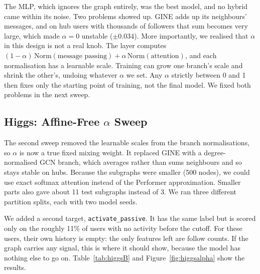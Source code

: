 The MLP, which ignores the graph entirely, was the best model, and no hybrid came within its noise. Two problems showed up. GINE adds up its neighbours' messages, and on hub users with thousands of followers that sum becomes very large, which made $\alpha=0$ unstable ($\pm0.034$). More importantly, we realised that $\alpha$ in this design is not a real knob. The layer computes $(1-\alpha)\,\mathrm{Norm}(\text{message passing}) + \alpha\,\mathrm{Norm}(\text{attention})$, and each normalisation has a learnable scale. Training can grow one branch's scale and shrink the other's, undoing whatever $\alpha$ we set. Any $\alpha$ strictly between 0 and 1 then fixes only the starting point of training, not the final model. We fixed both problems in the next sweep.

\subsection{Higgs: Affine-Free $\alpha$ Sweep}
The second sweep removed the learnable scales from the branch normalisations, so $\alpha$ is now a true fixed mixing weight. It replaced GINE with a degree-normalised GCN branch, which averages rather than sums neighbours and so stays stable on hubs. Because the subgraphs were smaller (500 nodes), we could use exact softmax attention instead of the Performer approximation. Smaller parts also gave about 11 test subgraphs instead of 3. We ran three different partition splits, each with two model seeds.

We added a second target, \texttt{activate\_\allowbreak passive}. It has the same label but is scored only on the roughly 11\% of users with no activity before the cutoff. For these users, their own history is empty: the only features left are follow counts. If the graph carries any signal, this is where it should show, because the model has nothing else to go on. Table~\ref{tab:higgsB} and Figure~\ref{fig:higgsalpha} show the results.

